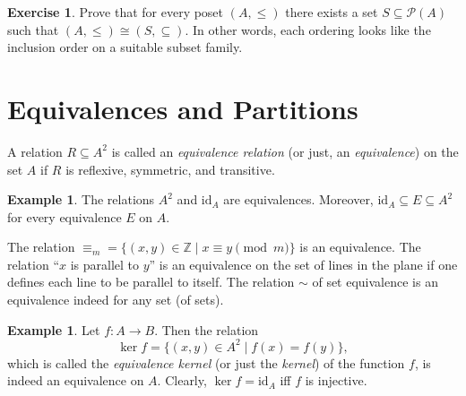 \documentclass[12pt,notitlepage]{article}
\theoremstyle{plain}
\theoremstyle{definition}
\newtheorem{exc}[thm]{Exercise}
\newtheorem{exm}[thm]{Example}
\theoremstyle{plain}
\newcommand{\Z}{\mathbb{Z}}
\newcommand{\sbs}{\subseteq}
\newcommand{\mP}{\mathcal{P}}
\newcommand{\id}{\mathrm{id}}
\newcommand{\1}{\mathbf{1}}
\newcommand{\0}{\mathbf{0}}
\begin{document}
\begin{exc}
Prove that for every poset $(A, \leq)$ there exists a set $S \sbs \mP(A)$ such that $(A, \leq) \cong (S, {\sbs})$. In other words, each ordering looks like the inclusion order on a suitable subset family.
\end{exc}

\newpage 
\section{Equivalences and Partitions}

A relation $R \sbs A^2$ is called an \emph{equivalence relation} (or just, an \emph{equivalence}) on the set $A$ if $R$ is reflexive, symmetric, and transitive.

\begin{exm}
The relations $A^2$ and $\id_A$ are equivalences. Moreover, $\id_A \sbs E \sbs A^2$ for every equivalence $E$ on $A$.

The relation $\equiv_m = \{ (x,y) \in \Z \mid  x \equiv y \pmod m \}$ is an equivalence. The relation ``$x$ is parallel to $y$'' is an equivalence on the set of lines in the plane if one defines each line to be parallel to itself. The relation ${\sim}$ of set equivalence is an equivalence indeed for any set (of sets).
\end{exm}

\begin{exm}
Let $f\colon A \to B$. Then the relation $$\ker f = \{(x,y) \in A^2 \mid f(x) = f(y)\},$$ which is called the \emph{equivalence kernel} (or just the \emph{kernel}) of the function $f$, is indeed an equivalence on $A$. Clearly, $\ker f = \id_A$ iff $f$ is injective.
\end{exm}
\end{document}
